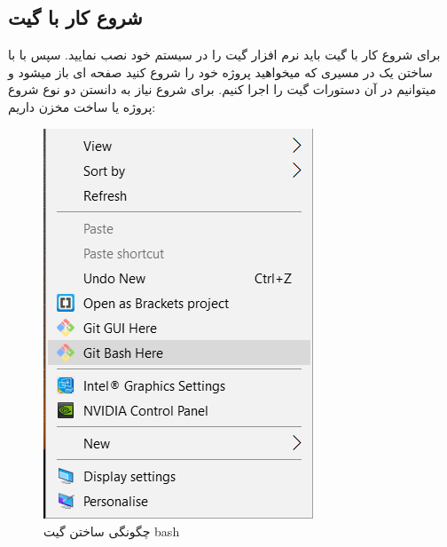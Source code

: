 \subsection{شروع کار با گیت}
برای شروع کار با گیت باید نرم افزار گیت را در سیستم خود نصب نمایید.
سپس با با ساختن یک  در مسیری که میخواهید پروژه خود را شروع کنید صفحه ای باز میشود و میتوانیم در آن دستورات گیت را اجرا کنیم. برای شروع نیاز به دانستن دو نوع شروع پروژه یا ساخت مخزن داریم:
\begin{figure}[tbh]
	\centering
	\includegraphics{./Figures/GitBash}
	\caption{ چگونگی ساختن گیت bash  }
	\label{Fig:GitBash}
\end{figure}
